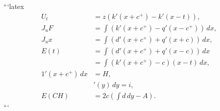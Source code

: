 ```latex
\begin{align}
    U_t &= z(k'(x + c^+) - k'(x - t)), \\
    J_u F &= \int (k'(x + c^+) - q'(x - c^+)) \, dx, \\
    J_u x &= \int (d'(x + c^+) + q'(x + c)) \, dx, \\
    E(t) &= \int (d'(x + c^+) + q'(x - c)) \, dx \\
    &= \int (k'(x + c^+) - c) (x - t) \, dx, \\
    1'(x + c^+) \, dx &= H, \\
    &'(y) \, dy = i, \\
    E(CH) &= 2c \left( \int d \, dy - A \right).
\end{align}
```

